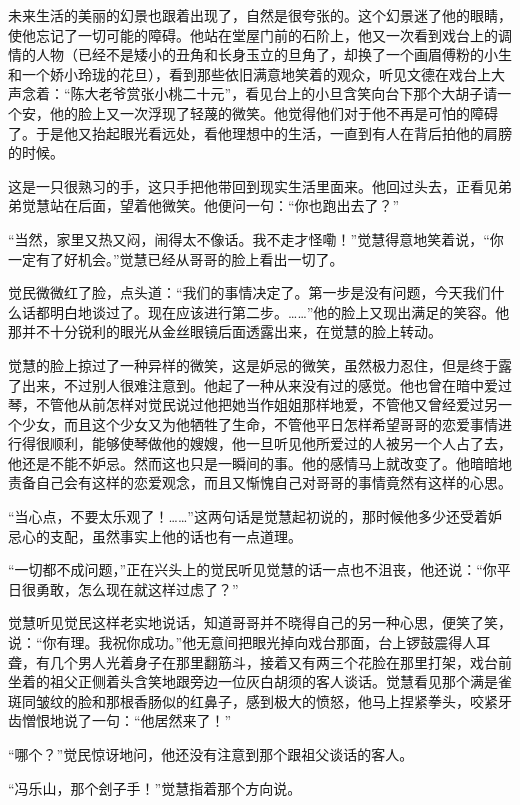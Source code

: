 \par 未来生活的美丽的幻景也跟着出现了，自然是很夸张的。这个幻景迷了他的眼睛，使他忘记了一切可能的障碍。他站在堂屋门前的石阶上，他又一次看到戏台上的调情的人物（已经不是矮小的丑角和长身玉立的旦角了，却换了一个画眉傅粉的小生和一个娇小玲珑的花旦），看到那些依旧满意地笑着的观众，听见文德在戏台上大声念着：“陈大老爷赏张小桃二十元”，看见台上的小旦含笑向台下那个大胡子请一个安，他的脸上又一次浮现了轻蔑的微笑。他觉得他们对于他不再是可怕的障碍了。于是他又抬起眼光看远处，看他理想中的生活，一直到有人在背后拍他的肩膀的时候。
\par 这是一只很熟习的手，这只手把他带回到现实生活里面来。他回过头去，正看见弟弟觉慧站在后面，望着他微笑。他便问一句：“你也跑出去了？”
\par “当然，家里又热又闷，闹得太不像话。我不走才怪嘞！”觉慧得意地笑着说，“你一定有了好机会。”觉慧已经从哥哥的脸上看出一切了。
\par 觉民微微红了脸，点头道：“我们的事情决定了。第一步是没有问题，今天我们什么话都明白地谈过了。现在应该进行第二步。……”他的脸上又现出满足的笑容。他那并不十分锐利的眼光从金丝眼镜后面透露出来，在觉慧的脸上转动。
\par 觉慧的脸上掠过了一种异样的微笑，这是妒忌的微笑，虽然极力忍住，但是终于露了出来，不过别人很难注意到。他起了一种从来没有过的感觉。他也曾在暗中爱过琴，不管他从前怎样对觉民说过他把她当作姐姐那样地爱，不管他又曾经爱过另一个少女，而且这个少女又为他牺牲了生命，不管他平日怎样希望哥哥的恋爱事情进行得很顺利，能够使琴做他的嫂嫂，他一旦听见他所爱过的人被另一个人占了去，他还是不能不妒忌。然而这也只是一瞬间的事。他的感情马上就改变了。他暗暗地责备自己会有这样的恋爱观念，而且又惭愧自己对哥哥的事情竟然有这样的心思。
\par “当心点，不要太乐观了！……”这两句话是觉慧起初说的，那时候他多少还受着妒忌心的支配，虽然事实上他的话也有一点道理。
\par “一切都不成问题，”正在兴头上的觉民听见觉慧的话一点也不沮丧，他还说：“你平日很勇敢，怎么现在就这样过虑了？”
\par 觉慧听见觉民这样老实地说话，知道哥哥并不晓得自己的另一种心思，便笑了笑，说：“你有理。我祝你成功。”他无意间把眼光掉向戏台那面，台上锣鼓震得人耳聋，有几个男人光着身子在那里翻筋斗，接着又有两三个花脸在那里打架，戏台前坐着的祖父正侧着头含笑地跟旁边一位灰白胡须的客人谈话。觉慧看见那个满是雀斑同皱纹的脸和那根香肠似的红鼻子，感到极大的愤怒，他马上捏紧拳头，咬紧牙齿憎恨地说了一句：“他居然来了！”
\par “哪个？”觉民惊讶地问，他还没有注意到那个跟祖父谈话的客人。
\par “冯乐山，那个刽子手！”觉慧指着那个方向说。
